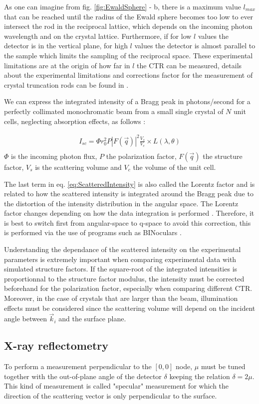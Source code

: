 As one can imagine from fig. \ref{fig:EwaldSphere} - b, there is a maximum value $l_{max}$ that can be reached until the radius of the Ewald sphere becomes too low to ever intersect the rod in the reciprocal lattice, which depends on the incoming photon wavelength and on the crystal lattice.
Furthermore, if for low $l$ values the detector is in the vertical plane, for high $l$ values the detector is almost parallel to the sample which limits the sampling of the reciprocal space.
These experimental limitations are at the origin of how far in $l$ the CTR can be measured, details about the experimental limitations and corrections factor for the measurement of crystal truncation rods can be found in \cite{Vlieg1997, Drnec2014}.

We can express the integrated intensity of a Bragg peak in photons/second for a perfectly collimated monochromatic beam from a small single crystal of $N$ unit cells, neglecting absorption effects, as follows \parencite{NielsenMcMorrow}:

\begin{gather}
    \label{eq:ScatteredIntensity}
    I_{sc} = \Phi r_0^2 P |F(\vec{q})|^2 \frac{V_s}{V_c} \times L(\lambda, \theta)\\
\end{gather}
$\Phi$ is the incoming photon flux, $P$ the polarization factor, $F(\vec{q})$ the structure factor, $V_s$ is the scattering volume and $V_c$ the volume of the unit cell.

The last term in eq. \ref{eq:ScatteredIntensity} is also called the Lorentz factor and is related to how the scattered intensity is integrated around the Bragg peak due to the distortion of the intensity distribution in the angular space.
The Lorentz factor changes depending on how the data integration is performed \parencite{Robach2000, Drnec2014}.
Therefore, it is best to switch first from angular-space to q-space to avoid this correction, this is performed via the use of programs such as BINoculars \parencite{Roobol2015}.

Understanding the dependance of the scattered intensity on the experimental parameters is extremely important when comparing experimental data with simulated structure factors.
If the square-root of the integrated intensities is proportionnal to the structure factor modulus, the intensity must be corrected beforehand for the polarization factor, especially when comparing different CTR.
Moreover, in the case of crystals that are larger than the beam, illumination effects must be considered since the scattering volume will depend on the incident angle between $\vec{k}_i$ and the surface plane.

\subsection{X-ray reflectometry}\label{sec:XRR}

To perform a measurement perpendicular to the $[0, 0]$ node, $\mu$ must be tuned together with the out-of-plane angle of the detector $\delta$ keeping the relation $\delta=2\mu$.
This kind of measurement is called "specular" measurement for which the direction of the scattering vector is only perpendicular to the surface.

